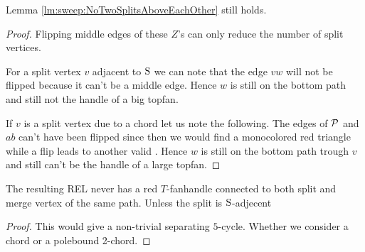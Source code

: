     \begin{lemma}
      \label{lm:sweep:NoTwoSplitsAboveEachOtherVertOnesided}
      Lemma \ref{lm:sweep:NoTwoSplitsAboveEachOther} still holds.
    \end{lemma}

    \begin{proof}
      Flipping middle edges of these $Z$'s  can only reduce the number of split vertices.

      For a split vertex $v$ adjacent to $\pS$ we can note that the edge $vw$ will not be flipped because it can't be a middle edge. Hence $w$ is still on the bottom path and still not the handle of a big topfan.

      If $v$ is a split vertex due to a chord let us note the following.
      The edges of $\P$ and $ab$ can't have been flipped since then we would find a monocolored red triangle while a flip leads to another valid \rel. Hence $w$ is still on the bottom path trough $v$ and still can't be the handle of a large topfan.
    \end{proof}

    \begin{lemma}
      \label{lm:uni:noTfan above whole path}
      The resulting REL never has a red $T$-fanhandle connected to both split and merge vertex of the same path. Unless the split is $\pS$-adjecent
    \end{lemma}
    \begin{proof}
        This would give a non-trivial separating $5$-cycle. Whether we consider a chord or a polebound 2-chord.
    \end{proof}
